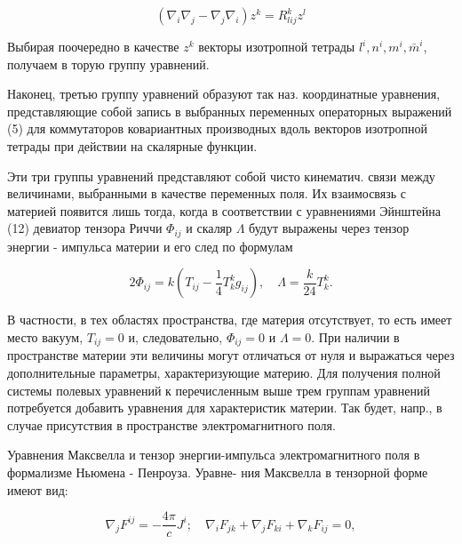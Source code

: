 \documentclass[10pt]{article}
\begin{document}
\[

\left(\nabla_{i} \nabla_{j}-\nabla_{j} \nabla_{i}\right) z^{k}=R_{l i j}^{k} z^{l}

\]



Выбирая поочередно в качестве $z^{k}$ векторы изотропной тетрады $l^{i}, n^{i}, m^{i}, \bar{m}^{i}$, получаем в торую группу уравнений.



Наконец, третью группу уравнений образуют так наз. координатные уравнения, представляющие собой запись в выбранных переменных операторных выражений (5) для коммутаторов ковариантных производных вдоль векторов изотропной тетрады при действии на скалярные функции.



Эти три группы уравнений представляют собой чисто кинематич. связи между величинами, выбранными в качестве переменных поля. Их взаимосвязь с материей появится лишь тогда, когда в соответствии с уравнениями Эйнштейна (12) девиатор тензора Риччи $\Phi_{i j}$ и скаляр $\Lambda$ будут выражены через тензор энергии - импульса материи и его след по формулам



\[

2 \Phi_{i j}=k\left(T_{i j}-\frac{1}{4} T_{k}^{k} g_{i j}\right), \quad \Lambda=\frac{k}{24} T_{k}^{k} .

\]



В частности, в тех областях пространства, где материя отсутствует, то есть имеет место вакуум, $T_{i j}=0$ и, следовательно, $\Phi_{i j}=0$ и $\Lambda=0$. При наличии в пространстве материи эти величины могут отличаться от нуля и выражаться через дополнительные параметры, характеризующие материю. Для получения полной системы полевых уравнений к перечисленным выше трем группам уравнений потребуется добавить уравнения для характеристик материи. Так будет, напр., в случае присутствия в пространстве электромагнитного поля.



Уравнения Максвелла и тензор энергии-импульса электромагнитного поля в формализме Ньюмена - Пенроуза. Уравне- ния Максвелла в тензорной форме имеют вид:



\[

\nabla_{j} F^{i j}=-\frac{4 \pi}{c} J^{i} ; \quad \nabla_{i} F_{j k}+\nabla_{j} F_{k i}+\nabla_{k} F_{i j}=0,

\]
\end{document}
